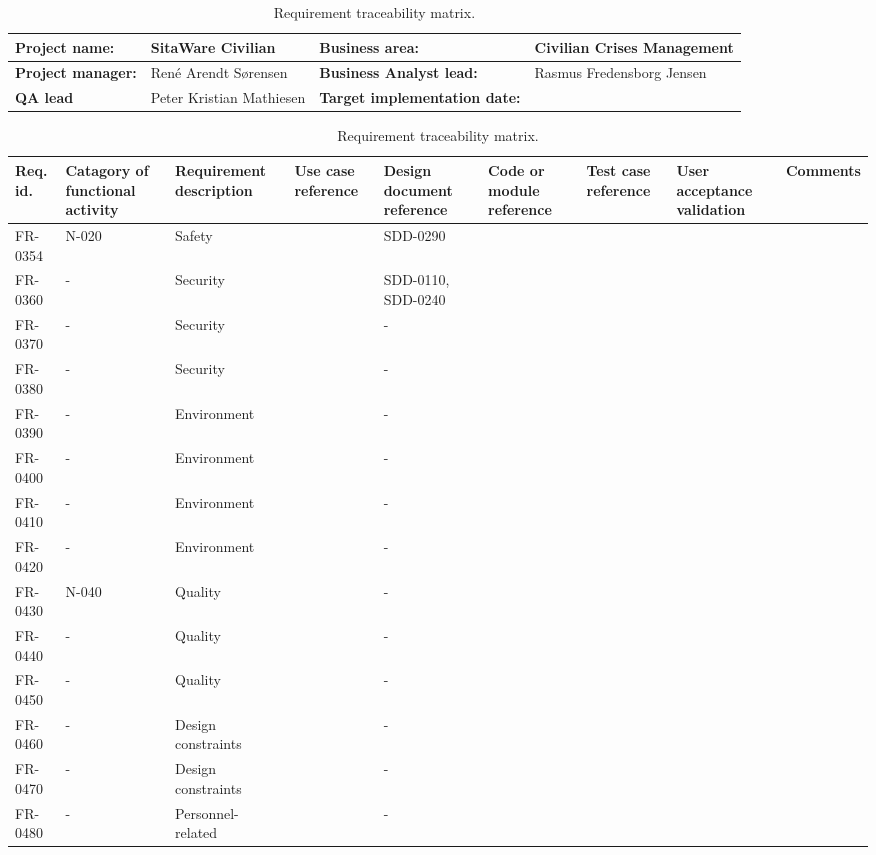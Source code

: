 \begin{sidewaystable}
\begin{table}[H]
\begin{tabular}{|l|l|l|l|}
\hline
 \textbf{Project name:} & SitaWare Civilian & \textbf{Business area:}  & Civilian Crises Management\\ \hline
 \textbf{Project manager:} & René Arendt Sørensen & \textbf{Business Analyst lead:} & Rasmus Fredensborg  Jensen\\ \hline
 \textbf{QA lead} & Peter Kristian Mathiesen & \textbf{Target implementation date:}  & \\ \hline
\end{tabular}	
\begin{tabular}{|p{2cm}|p{2cm}|p{3cm}|p{2cm}|p{4cm}|p{1cm}|p{1cm}|p{2cm}|p{2cm}|}
\hline
 Req. id. & Catagory of functional activity & Requirement description  & Use case reference & Design document reference & Code or module reference & Test case reference & User acceptance validation & Comments\\ \hline
 FR-0354 & N-020 & Safety & &SDD-0290 & & & &\\ \hline
 FR-0360 & - & Security & &SDD-0110, SDD-0240 & & & &\\ \hline
 FR-0370 & - & Security & &- & & & &\\ \hline   	
 FR-0380 & - & Security & &- & & & &\\ \hline
 FR-0390 & - & Environment & &- & & & &\\ \hline
 FR-0400 & - & Environment & &- & & & &\\ \hline
 FR-0410 & - & Environment & &- & & & &\\ \hline
 FR-0420 & - & Environment & &- & & & &\\ \hline
 FR-0430 & N-040 & Quality & &- & & & &\\ \hline
 FR-0440 & - & Quality & &- & & & &\\ \hline
 FR-0450 & - & Quality & &- & & & &\\ \hline
 FR-0460 & - & Design constraints & &- & & & &\\ \hline
 FR-0470 & - & Design constraints & &- & & & &\\ \hline
 FR-0480 & - & Personnel-related & &- & & & &\\ \hline 
 
\end{tabular}	
\caption{Requirement traceability matrix.}
\end{table}

\end{sidewaystable}